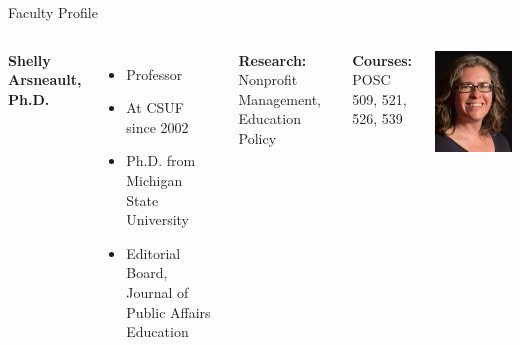 \documentclass[10pt]{beamer}
\newlength{\imageheight}
\begin{document}
    \begin{frame}{Faculty Profile}
    \begin{columns}[t]
    \textbf{Shelly Arsneault, Ph.D.}
    \begin{itemize}
    \item Professor
    \item At CSUF since 2002
    \item Ph.D. from Michigan State University
    \item Editorial Board, Journal of Public Affairs Education
    \end{itemize}
    
    \textbf{Research:} Nonprofit Management, Education Policy
    
    \textbf{Courses:} POSC 509, 521, 526, 539
    
    \vspace*{0.5cm}
    \includegraphics[height=\imageheight]{images/arsneault.png}
    \end{columns}
    \end{frame}
\end{document}
